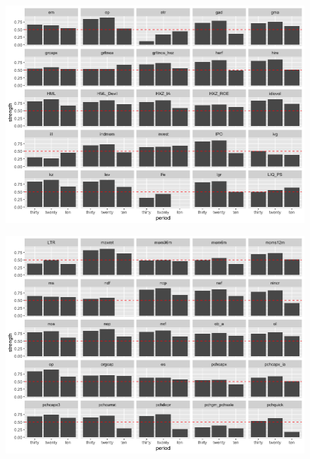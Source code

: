 \begin{landscape}
	\begin{figure}[ht]
		\includegraphics[scale = 0.75]{strength_comparison_III}
		\centering
	\end{figure}
\end{landscape}

\begin{landscape}
	\begin{figure}[ht]
		\includegraphics[scale = 0.75]{strength_comparison_IV}
		\centering
	\end{figure}
\end{landscape}

